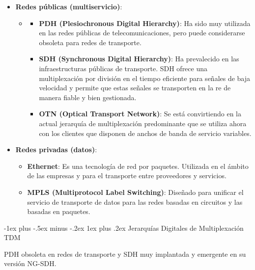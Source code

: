 \documentclass[10pt,portrait, twocolumn]{article}
\makeatletter
\renewcommand{\subsubsection}{\@startsection{subsubsection}{3}{0mm}%
                                {-1ex plus -.5ex minus -.2ex}%
                                {1ex plus .2ex}%
                                {\normalfont\small\bfseries}}
\makeatother
\begin{document}
\begin{itemize}
\item \textbf{Redes públicas (multiservicio)}: 
	\begin{itemize}
	\item \begin{itemize}
	\item \textbf{PDH (Plesiochronous Digital Hierarchy)}: Ha sido muy utilizada en las redes públicas de telecomunicaciones, pero puede considerarse obsoleta para redes de transporte.
	\item \textbf{SDH (Synchronous Digital Hierarchy)}: Ha prevalecido en las infraestructuras públicas de transporte. SDH ofrece una multiplexación por división en el tiempo eficiente para señales de baja velocidad y permite que estas señales se transporten en la re de manera fiable y bien gestionada.
	\item \textbf{OTN (Optical Transport Network)}: Se está convirtiendo en la actual jerarquía de multiplexación predominante que se utiliza ahora con los clientes que disponen de anchos de banda de servicio variables.
	\end{itemize}
	\end{itemize}
	\item \textbf{Redes privadas (datos)}: 
		\begin{itemize}
		\item \textbf{Ethernet}: Es una tecnología de red por paquetes. Utilizada en el ámbito de las empresas y para el transporte entre proveedores y servicios.
		\item \textbf{MPLS  (Multiprotocol Label Switching)}: Diseñado para unificar el servicio de transporte de datos para las redes basadas en circuitos y las basadas en paquetes.
		\end{itemize}
\end{itemize}
 
 

\subsubsection{Jerarquías Digitales de Multiplexación TDM}

PDH obsoleta en redes de transporte y SDH muy implantada y emergente en su versión NG-SDH.\\
\end{document}
